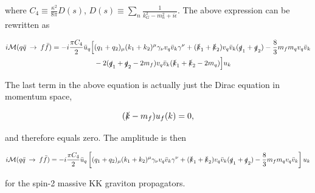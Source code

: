 \documentclass[11pt,a4paper]{article}
\begin{document}
 where $C_4 \equiv \frac{\kappa^2}{8\pi} D(s)$, $D(s) \equiv \sum_{n} \frac{1}{k_G^2 - m_n^2 + i\epsilon}$. The above expression can be rewritten as

\begin{align}
	\begin{split}
	i\mathcal{M}(q\bar{q}\:\rightarrow\:f\bar{f}) = -i\frac{\pi C_4}{2}\bar{u}_q\Big[&(q_1 + q_2)_ \mu(k_1+k_2)^\mu \gamma_\nu v_q\bar{v}_k\gamma^\nu + (\slashed k_1 + \slashed k_2)v_q\bar{v}_k(\slashed q_1 + \slashed q_2) - \frac{8}{3}m_fm_qv_q\bar{v}_k\\
	&-2(\slashed q_1 + \slashed q_2 - 2m_f)v_q\bar{v}_k(\slashed k_1 + \slashed k_2 - 2m_q)\Big]u_k
	\end{split}
\end{align}

The last term in the above equation is actually just the Dirac equation in momentum space,

\begin{equation}
	(\slashed k - m_f)u_f(k) = 0,
\end{equation}

and therefore equals zero. The amplitude is then

\begin{equation}
	i\mathcal{M}(q\bar{q}\:\rightarrow\:f\bar{f}) = -i\frac{\pi C_4}{2}\bar{u}_q\left[(q_1 + q_2)_ \mu(k_1+k_2)^\mu \gamma_\nu v_q\bar{v}_k\gamma^\nu + (\slashed k_1 + \slashed k_2)v_q\bar{v}_k(\slashed q_1 + \slashed q_2) - \frac{8}{3}m_fm_qv_q\bar{v}_k\right]u_k
\end{equation}

for the spin-2 massive KK graviton propagators.
\end{document}
